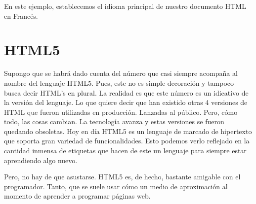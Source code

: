\documentclass[12pt, letterpaper]{article}
\begin{document}
En este ejemplo, establecemos el idioma principal de nuestro documento HTML en Francés. 

\section*{HTML5}

Supongo que se habrá dado cuenta del número que casi siempre acompaña al nombre del lenguaje HTML5. Pues, este no es simple decoración y tampoco
busca decir HTML's en plural. La realidad es que este número es un idicativo de la versión del lenguaje. Lo que quiere decir que han existido otras
4 versiones de HTML que fueron utilizadas en producción. Lanzadas al público. Pero, cómo todo, las cosas cambian. La tecnología avanza y estas
versiones se fueron quedando obsoletas. Hoy en día HTML5 es un lenguaje de marcado de hipertexto que soporta gran variedad de funcionalidades. 
Esto podemos verlo reflejado en la cantidad inmensa de etiquetas que hacen de este un lenguaje para siempre estar aprendiendo algo nuevo. 

Pero, no hay de que asustarse. HTML5 es, de hecho, bastante amigable con el programador. Tanto, que se suele usar cómo un medio de aproximación 
al momento de aprender a programar páginas web. 
\end{document}
